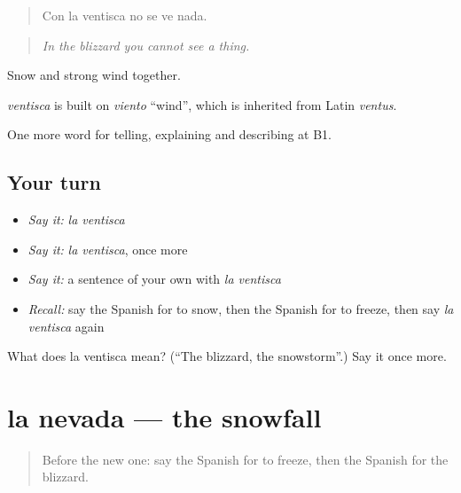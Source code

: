 \begin{quote}
Con la ventisca no se ve nada.
\end{quote}

\begin{quote}
\emph{In the blizzard you cannot see a thing.}
\end{quote}

Snow and strong wind together.

\begin{cousinweb}
\emph{ventisca} is built on \emph{viento} \textquotedblleft{}wind\textquotedblright{}, which is inherited from Latin \emph{ventus}.
\end{cousinweb}

\begin{grammarlens}[title={What you've built}]
One more word for telling, explaining and describing at B1.
\end{grammarlens}

\subsection*{Your turn}
\begin{itemize}
\raggedright
  \item \emph{Say it:} \emph{la ventisca}
  \item \emph{Say it:} \emph{la ventisca}, once more
  \item \emph{Say it:} a sentence of your own with \emph{la ventisca}
  \item \emph{Recall:} say the Spanish for to snow, then the Spanish for to freeze, then say \emph{la ventisca} again
\end{itemize}

\begin{tcolorbox}[breakable,colback=teal!4,colframe=teal!35!black,title={Before you move on}]
What does la ventisca mean? (\textquotedblleft{}The blizzard, the snowstorm\textquotedblright{}.) Say it once more.
\end{tcolorbox}
\section[la nevada]{la nevada — the snowfall}

\label{lesson:ES-C700-nevada}



\begin{quote}
Before the new one: say the Spanish for to freeze, then the Spanish for the blizzard.
\end{quote}

